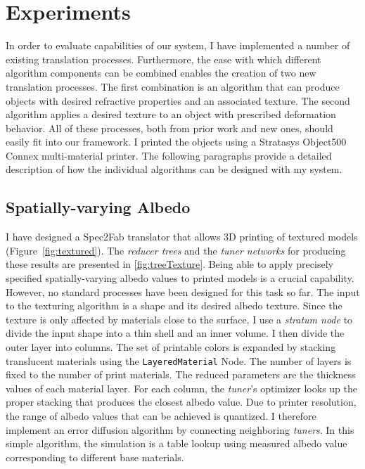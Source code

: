 \chapter{Experiments}
\label{chap:results}
In order to evaluate capabilities of our system, I have implemented a number of existing translation processes.
Furthermore, the ease with which different algorithm components can be combined enables the creation of two new translation processes.
The first combination is an algorithm that can produce objects with desired refractive properties and an associated texture.
The second algorithm applies a desired texture to an object with prescribed deformation behavior.
All of these processes, both from prior work and new ones, should easily fit into our framework. I printed the objects using a Stratasys Object500 Connex  multi-material printer.
The following paragraphs provide a detailed description of how the individual algorithms can be designed with my system.

\section{Spatially-varying Albedo}
I have designed a Spec2Fab translator that allows 3D printing of textured models (Figure~\ref{fig:textured}).
The \emph{reducer trees} and the \emph{tuner networks} for producing these results are presented in 
\autoref{fig:treeTexture}.
Being able to apply precisely specified spatially-varying albedo values to printed models is a crucial capability.
However, no standard processes have been designed for this task so far.
The input to the texturing algorithm is a shape and its desired albedo texture.
Since the texture is only affected by materials close to the surface,
I use a \emph{stratum node} to divide the input shape into a thin shell and an inner volume.
I then divide the outer layer into columns.
The set of printable colors is expanded by stacking translucent materials using the \verb|LayeredMaterial| Node.
The number of layers is fixed to the number of print materials.
The reduced parameters are the thickness values of each material layer.
For each column, the \emph{tuner}'s optimizer looks up the proper stacking that produces the closest albedo value.
Due to printer resolution, the range of albedo values that can be achieved is quantized.
I therefore implement an error diffusion algorithm by connecting neighboring \emph{tuners}.
In this simple algorithm, the simulation is a table lookup using measured albedo value corresponding to different base materials.


